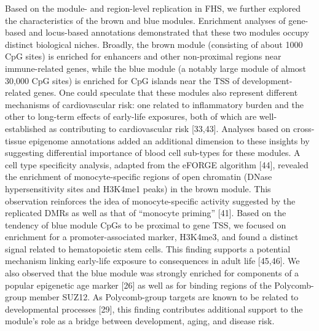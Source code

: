 \documentclass[]{bmcart}
\begin{document}
Based on the module- and region-level replication in FHS, we further
explored the characteristics of the brown and blue modules. Enrichment
analyses of gene-based and locus-based annotations demonstrated that
these two modules occupy distinct biological niches. Broadly, the brown
module (consisting of about 1000 CpG sites) is enriched for enhancers
and other non-proximal regions near immune-related genes, while the blue
module (a notably large module of almost 30,000 CpG sites) is enriched
for CpG islands near the TSS of development-related genes. One could
speculate that these modules also represent different mechanisms of
cardiovascular risk: one related to inflammatory burden and the other to
long-term effects of early-life exposures, both of which are
well-established as contributing to cardiovascular risk {[}33,43{]}.
Analyses based on cross-tissue epigenome annotations added an additional
dimension to these insights by suggesting differential importance of
blood cell sub-types for these modules. A cell type specificity
analysis, adapted from the eFORGE algorithm {[}44{]}, revealed the
enrichment of monocyte-specific regions of open chromatin (DNase
hypersensitivity sites and H3K4me1 peaks) in the brown module. This
observation reinforces the idea of monocyte-specific activity suggested
by the replicated DMRs as well as that of ``monocyte priming'' {[}41{]}.
Based on the tendency of blue module CpGs to be proximal to gene TSS, we
focused on enrichment for a promoter-associated marker, H3K4me3, and
found a distinct signal related to hematopoietic stem cells. This
finding supports a potential mechanism linking early-life exposure to
consequences in adult life {[}45,46{]}. We also observed that the blue
module was strongly enriched for components of a popular epigenetic age
marker {[}26{]} as well as for binding regions of the Polycomb-group
member SUZ12. As Polycomb-group targets are known to be related to
developmental processes {[}29{]}, this finding contributes additional
support to the module's role as a bridge between development, aging, and
disease risk.
\end{document}
